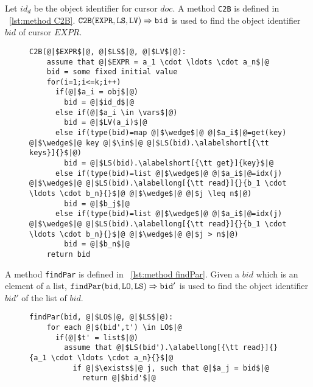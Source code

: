 {Let $id_d$ be the object identifier for cursor $doc$. A method {\tt C2B} is defined in \figureautorefname~\ref{lst:method C2B}. $\alabellong[{\tt C2B}]{EXPR,LS,LV}{bid}{}$ is used to find the object identifier $bid$ of cursor $EXPR$.

\begin{figure}[t]
\begin{lstlisting}[basicstyle=\ttfamily\scriptsize,caption={\vspace{-1mm}Method {\tt C2B}.},captionpos=b,label={lst:method C2B}]
  C2B(@|$EXPR$|@, @|$LS$|@, @|$LV$|@):
    assume that @|$EXPR = a_1 \cdot \ldots \cdot a_n$|@
    bid = some fixed initial value
    for(i=1;i<=k;i++)
      if(@|$a_i = obj$|@)
        bid = @|$id_d$|@
      else if(@|$a_i \in \vars$|@)
        bid = @|$LV(a_i)$|@
      else if(type(bid)=map @|$\wedge$|@ @|$a_i$|@=get(key) @|$\wedge$|@ key @|$\in$|@ @|$LS(bid).\alabelshort[{\tt keys}]{}$|@)
        bid = @|$LS(bid).\alabelshort[{\tt get}]{key}$|@
      else if(type(bid)=list @|$\wedge$|@ @|$a_i$|@=idx(j) @|$\wedge$|@ @|$LS(bid).\alabellong[{\tt read}]{}{b_1 \cdot \ldots \cdot b_n}{}$|@ @|$\wedge$|@ @|$j \leq n$|@)
        bid = @|$b_j$|@
      else if(type(bid)=list @|$\wedge$|@ @|$a_i$|@=idx(j) @|$\wedge$|@ @|$LS(bid).\alabellong[{\tt read}]{}{b_1 \cdot \ldots \cdot b_n}{}$|@ @|$\wedge$|@ @|$j > n$|@)
        bid = @|$b_n$|@
    return bid
\end{lstlisting}
\vspace{-5mm}
\end{figure}

A method {\tt findPar} is defined in \figureautorefname~\ref{lst:method findPar}. Given a $bid$ which is an element of a list, $\alabellong[{\tt findPar}]{bid,LO,LS}{bid'}{}$ is used to find the object identifier $bid'$ of the list of $bid$.

\begin{figure}[t]
\begin{lstlisting}[basicstyle=\ttfamily\scriptsize,caption={\vspace{-1mm}Method {\tt findPar}.},captionpos=b,label={lst:method findPar}]
  findPar(bid, @|$LO$|@, @|$LS$|@):
    for each @|$(bid',t') \in LO$|@
      if(@|$t' = list$|@)
        assume that @|$LS(bid').\alabellong[{\tt read}]{}{a_1 \cdot \ldots \cdot a_n}{}$|@
          if @|$\exists$|@ j, such that @|$a_j = bid$|@
            return @|$bid'$|@
\end{lstlisting}
\vspace{-5mm}
\end{figure}

}
